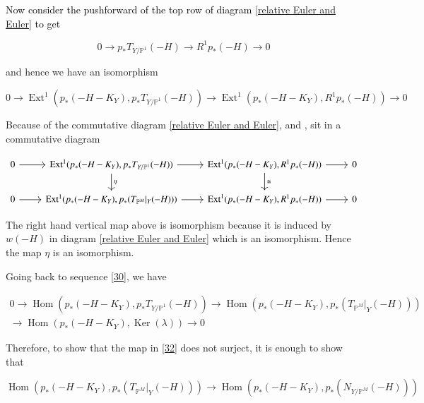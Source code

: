 \documentclass[11pt,twoside]{amsart}
\theoremstyle{plain}
\numberwithin{equation}{section}
\theoremstyle{definition}
\begin{document}
\textcolor{black}{Now consider the pushforward of the top row of diagram \ref{relative Euler and Euler} to get} 

\begin{equation}\label{29}
 0 \to p_*T_{Y/\mathbb{P}^1}(-H) \to R^1p_*(-H) \to 0 
\end{equation}

\color{black}
and hence we have an isomorphism 

\begin{equation}\label{top hor}
 0 \to \operatorname{Ext}^1(p_*(-H-K_Y), p_*T_{Y/\mathbb{P}^1}(-H)) \to \operatorname{Ext}^1(p_*(-H-K_Y), R^1p_*(-H)) \to 0 
\end{equation}

Because of the commutative diagram \ref{relative Euler and Euler},  
 and , sit in a commutative diagram

\[
\begin{tikzcd}
0 \arrow[r] & \operatorname{Ext}^1(p_*(-H-K_Y), p_*T_{Y/\mathbb{P}^1}(-H)) \arrow[d, "\eta"] \arrow[r] & \operatorname{Ext}^1(p_*(-H-K_Y), R^1p_*(-H)) \arrow[r] \arrow[d, "\cong"] & 0 \\
0 \arrow[r] & \operatorname{Ext^1}(p_*(-H-K_Y), 
 p_*(T_{\mathbb{P}^M}|_Y(-H))) \arrow[r] & \operatorname{Ext}^1(p_*(-H-K_Y), R^1p_*(-H)) \arrow[r] & 0
\end{tikzcd}
\]

The right hand vertical map above is isomorphism because it is induced by $w(-H)$ in diagram \ref{relative Euler and Euler} which is an isomorphism. Hence the map $\eta$ is an isomorphism.

\color{black}
Going back to sequence \ref{30}, we have 

\begin{multline}\label{31}
0 \to \operatorname{Hom}(p_*(-H-K_Y), 
 p_*T_{Y/\mathbb{P}^1}(-H))  \to \operatorname{Hom}(p_*(-H-K_Y), p_*(T_{\mathbb{P}^M}|_Y(-H))) \\ \to \operatorname{Hom}(p_*(-H-K_Y),\operatorname{Ker}(\lambda)) \to 0
\end{multline}

Therefore, to show that the map in \ref{32} does not surject, it is enough to show that

\begin{equation}\label{33}
  \operatorname{Hom}(p_*(-H-K_Y), p_*(T_{\mathbb{P}^M}|_Y(-H))) \to \operatorname{Hom}(p_*(-H-K_Y), p_*(N_{Y/\mathbb{P}^M}(-H)))  
\end{equation}
\end{document}
